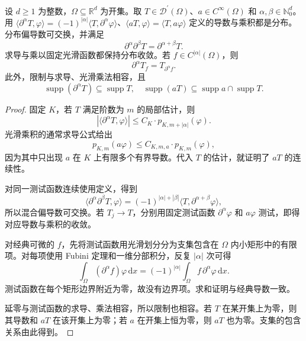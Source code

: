 \begin{proposition}\label{b1:prop:distribution-derivative-calculus}
设 \(d\geq1\) 为整数，\(\Omega\subseteq\mathbb R^d\) 为开集。取 \(T\in\mathcal D^{\prime}(\Omega)\)、\(a\in C^\infty(\Omega)\) 和 \(\alpha,\beta\in\mathbb N_0^d\)。用 \(\langle\partial^\alpha T,\varphi\rangle=(-1)^{|\alpha|}\langle T,\partial^\alpha\varphi\rangle\)、\(\langle aT,\varphi\rangle=\langle T,a\varphi\rangle\) 定义的导数与乘积都是分布。分布偏导数可交换，并满足
\[
 \partial^\alpha\partial^\beta T=\partial^{\alpha+\beta}T.
\]
求导与乘以固定光滑函数都保持分布收敛。若 \(f\in C^{|\alpha|}(\Omega)\)，则
\[
 \partial^\alpha T_f=T_{\partial^\alpha f}.
\]
此外，限制与求导、光滑乘法相容，且
\[
 \operatorname{supp}(\partial^\alpha T)\subseteq\operatorname{supp}T,\quad
 \operatorname{supp}(aT)\subseteq\operatorname{supp}a\cap\operatorname{supp}T.
\]
\end{proposition}
\begin{proof}
固定 \(K\)，若 \(T\) 满足阶数为 \(m\) 的局部估计，则
\[
 |\langle\partial^\alpha T,\varphi\rangle|
 \leq C_K\cdot p_{K,m+|\alpha|}(\varphi).
\]
光滑乘积的通常求导公式给出
\[
 p_{K,m}(a\varphi)
 \leq C_{K,m,a}\cdot p_{K,m}(\varphi),
\]
因为其中只出现 \(a\) 在 \(K\) 上有限多个有界导数。代入 \(T\) 的估计，就证明了 \(aT\) 的连续性。

对同一测试函数连续使用定义，得到
\[
 \langle\partial^\alpha\partial^\beta T,\varphi\rangle
 =(-1)^{|\alpha|+|\beta|}
       \langle T,\partial^{\alpha+\beta}\varphi\rangle,
\]
所以混合偏导数可交换。若 \(T_j\rightarrow T\)，分别用固定测试函数 \(\partial^\alpha\varphi\) 和 \(a\varphi\) 测试，即得对应导数与乘积的收敛。

对经典可微的 \(f\)，先将测试函数用光滑划分分为支集包含在 \(\Omega\) 内小矩形中的有限项。对每项使用 Fubini 定理和一维分部积分，反复 \(|\alpha|\) 次可得
\[
 \int_\Omega(\partial^\alpha f)\varphi\,\mathrm dx
 =(-1)^{|\alpha|}\int_\Omega f\,\partial^\alpha\varphi\,\mathrm dx.
\]
测试函数在每个矩形边界附近为零，故没有边界项。求和证明与经典导数一致。

延零与测试函数的求导、乘法相容，所以限制也相容。若 \(T\) 在某开集上为零，则其导数和 \(aT\) 在该开集上为零；若 \(a\) 在开集上恒为零，则 \(aT\) 也为零。支集的包含关系由此得到。
\end{proof}


